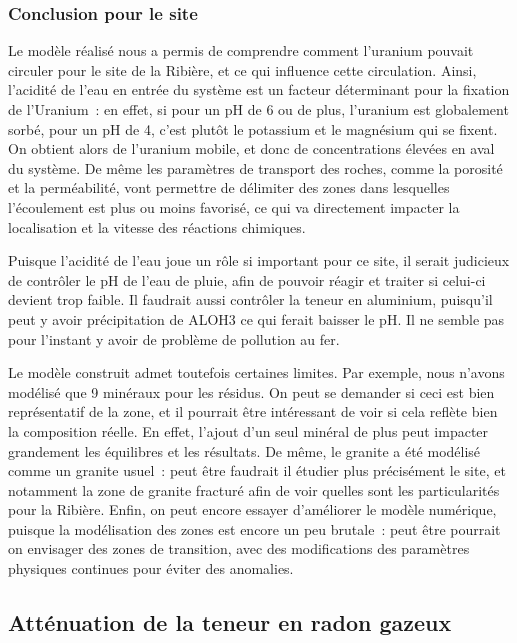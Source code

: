 \documentclass{article}
\begin{document}
\subsubsection{Conclusion pour le site}
Le modèle réalisé nous a permis de comprendre comment l’uranium pouvait circuler pour le site de la Ribière, et ce qui influence cette circulation. Ainsi, l’acidité de l’eau en entrée du système est un facteur déterminant pour la fixation de l’Uranium : en effet, si pour un pH de 6 ou de plus, l’uranium est globalement sorbé, pour un pH de 4, c’est plutôt le potassium et le magnésium qui se fixent. On obtient alors de l’uranium mobile, et donc de concentrations élevées en aval du système. De même les paramètres de transport des roches, comme la porosité et la perméabilité, vont permettre de délimiter des zones dans lesquelles l’écoulement est plus ou moins favorisé, ce qui va directement impacter la localisation et la vitesse des réactions chimiques.

Puisque l’acidité de l’eau joue un rôle si important pour ce site, il serait judicieux de contrôler le pH de l’eau de pluie, afin de pouvoir réagir et traiter si celui-ci devient trop faible. Il faudrait aussi contrôler la teneur en aluminium, puisqu’il peut y avoir précipitation de ALOH3 ce qui ferait baisser le pH. Il ne semble pas pour l’instant y avoir de problème de pollution au fer.

Le modèle construit admet toutefois certaines limites. Par exemple, nous n’avons modélisé que 9 minéraux pour les résidus. On peut se demander si ceci est bien représentatif de la zone, et il pourrait être intéressant de voir si cela reflète bien la composition réelle. En effet, l’ajout d’un seul minéral de plus peut impacter grandement les équilibres et les résultats. De même, le granite a été modélisé comme un granite usuel : peut être faudrait il étudier plus précisément le site, et notamment la zone de granite fracturé afin de voir quelles sont les particularités pour la Ribière. Enfin, on peut encore essayer d’améliorer le modèle numérique, puisque la modélisation des zones est encore un peu brutale : peut être pourrait on envisager des zones de transition, avec des modifications des paramètres physiques continues pour éviter des anomalies.

\subsection{Atténuation de la teneur en radon gazeux}
\end{document}

